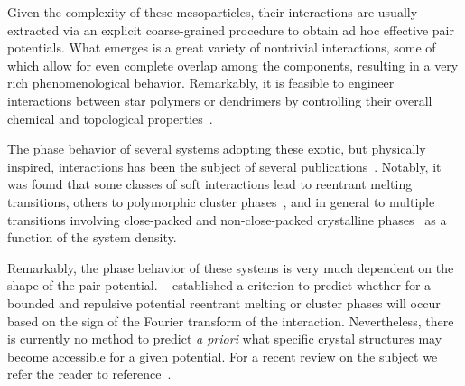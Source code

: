 Given the complexity of these mesoparticles, their interactions are usually 
extracted via an explicit coarse-grained procedure to obtain ad hoc effective pair potentials. 
What emerges is a great variety of nontrivial interactions, some of which allow for even 
complete overlap among the components, resulting in a very rich phenomenological behavior.
Remarkably, it is feasible to engineer interactions between star polymers or dendrimers
by controlling their overall chemical and topological properties~\cite{mladek}. 
   
The phase behavior of several systems adopting these exotic, but physically inspired, interactions
has been the subject of several publications~\cite{louis,likos0,richter,likosB,denton,gottawald,pierleoni, bozorgui, capone, xu,prestipino}. 
Notably, it was found that some classes  of soft interactions lead 
to  reentrant melting transitions, others to polymorphic cluster phases~\cite{mladek2}, and in general to multiple  transitions 
involving close-packed and non-close-packed crystalline phases~\cite{suto,LikosNat,pephertz} as a function of the system density.  

Remarkably,  the phase behavior of these systems is very much dependent on the shape of the pair potential. 
\citeauthor{likos}~\cite{likos} established a criterion 
to predict whether for a bounded and repulsive potential reentrant melting or cluster phases will occur based
on the sign of the Fourier transform of the interaction.
Nevertheless, there is currently no method to predict \textit{a priori} what specific crystal structures may become 
accessible for a given potential. 
For a recent review on the subject we refer the reader to reference~\cite{LikosRev}. 
  
